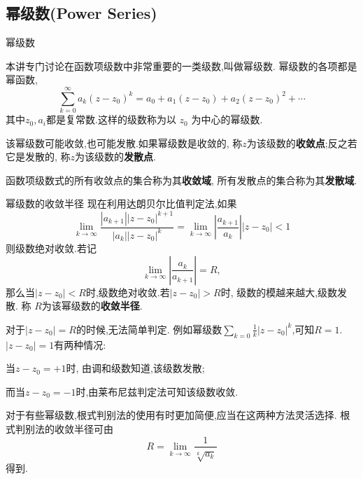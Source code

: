 \documentclass[fontset=windows, chinese, 10pt]{beamer}
\begin{document}
  
  \subsection{幂级数(Power Series)}

\begin{frame}{幂级数}
 
本讲专门讨论在函数项级数中非常重要的一类级数,叫做幂级数.
幂级数的各项都是幂函数,
\begin{equation}
    \sum_{k=0}^{\infty} a_k\left(z-z_0\right)^k=a_0+a_1\left(z-z_0\right)+a_2\left(z-z_0\right)^2+\cdots
\end{equation}
其中$z_0, a_i$都是复常数.这样的级数称为以 $z_0$ 为中心的幂级数.

该幂级数可能收敛,也可能发散.如果幂级数是收敛的,
称$z$为该级数的\textbf{收敛点};反之若它是发散的,
称$z$为该级数的\textbf{发散点}.

函数项级数式的所有收敛点的集合称为其\textbf{收敛域},
所有发散点的集合称为其\textbf{发散域}.


\end{frame}



  \begin{frame}{幂级数的收敛半径}
  \small
    现在利用达朗贝尔比值判定法,如果
\begin{equation}
    \lim _{k \rightarrow \infty} \frac{\left|a_{k+1}\right|\left|z-z_0\right|^{k+1}}{\left|a_k\right|\left|z-z_0\right|^k}
    =\lim _{k \rightarrow \infty}\left|\frac{a_{k+1}}{a_k}\right|\left|z-z_0\right|<1
\end{equation}
则级数绝对收敛.若记
\begin{equation}
    \lim_{k \rightarrow \infty} \left|\frac{a_{k}}{a_{k+1}}\right| = R,
\end{equation}
那么当$|z-z_0| < R$时,级数绝对收敛.若$|z-z_0| > R$时, 级数的模越来越大,级数发散.
称 $R$为该幂级数的\textbf{收敛半径}.

对于$|z-z_0| = R$的时候,无法简单判定.
例如幂级数$\sum_{k=0} \frac{1}{k} |z-z_0|^k$,可知$R=1$. $|z-z_0|=1$有两种情况:

当$z-z_0 = +1$时, 由调和级数知道,该级数发散;

而当$z-z_0 = -1$时,由莱布尼兹判定法可知该级数收敛.

对于有些幂级数,根式判别法的使用有时更加简便,应当在这两种方法灵活选择.
根式判别法的收敛半径可由
\begin{equation}
    R = \lim_{k \rightarrow \infty} \frac{1}{\sqrt[k]{a_k}}
\end{equation}
得到.



  \end{frame}
\end{document}
